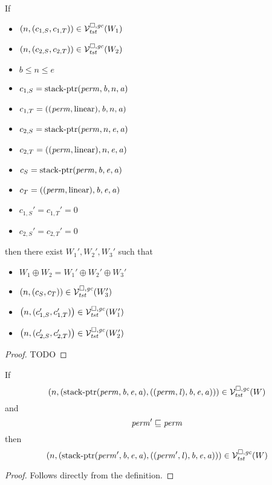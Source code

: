 \begin{lemma}
  \label{lem:splitting-safety-stack}
  If
  \begin{itemize}
  \item $\left(n,(c_{1,S},c_{1,T})\right) \in \mathcal{V}^{\square,\mathit{gc}}_{\mathit{tst}}(W_1)$
  \item $\left(n,(c_{2,S},c_{2,T})\right) \in \mathcal{V}^{\square,\mathit{gc}}_{\mathit{tst}}(W_2)$
  \item $b \le n \le e$
  \item $c_{1,S} = \mathrm{stack\text{-}ptr}(\mathit{perm},\mathit{b},n,\mathit{a})$
  \item $c_{1,T} = ((\mathit{perm},\mathrm{linear}),\mathit{b},n,\mathit{a})$
  \item $c_{2,S} = \mathrm{stack\text{-}ptr}(\mathit{perm},n,\mathit{e},\mathit{a})$
  \item $c_{2,T} = ((\mathit{perm},\mathrm{linear}),n,\mathit{e},\mathit{a})$
  \item $c_S = \mathrm{stack\text{-}ptr}(\mathit{perm},\mathit{b},\mathit{e},\mathit{a})$
  \item $c_T = ((\mathit{perm},\mathrm{linear}),\mathit{b},\mathit{e},\mathit{a})$
  \item $c_{1,S}' = c_{1,T}' = 0$
  \item $c_{2,S}' = c_{2,T}' = 0$
  \end{itemize}
  then there exist $W_1',W_2',W_3'$ such that
  \begin{itemize}
  \item $W_1 \oplus W_2 = W_1' \oplus W_2' \oplus W_3'$
  \item $\left(n,(c_S,c_T)\right) \in \mathcal{V}^{\square,\mathit{gc}}_{\mathit{tst}}(W_3')$
  \item $\left(n,(c_{1,S}',c_{1,T}')\right) \in \mathcal{V}^{\square,\mathit{gc}}_{\mathit{tst}}(W_1')$
  \item $\left(n,(c_{2,S}',c_{2,T}')\right) \in \mathcal{V}^{\square,\mathit{gc}}_{\mathit{tst}}(W_2')$
  \end{itemize}
\end{lemma}
\begin{proof}
  TODO
\end{proof}

\begin{lemma}
\label{lem:stkptr-in-lrv-mono-perm}
  If
  \[
    \left(n,(\mathrm{stack\text{-}ptr}(\mathit{perm},\mathit{b},\mathit{e},\mathit{a}),((\mathit{perm},\mathit{l}),\mathit{b},\mathit{e},\mathit{a}))\right) \in \mathcal{V}^{\square,\mathit{gc}}_{\mathit{tst}}(W)
  \]
  and
  \[
    \mathit{perm}' \sqsubseteq \mathit{perm}
  \]
  then
  \[
    \left(n,(\mathrm{stack\text{-}ptr}(\mathit{perm}',\mathit{b},\mathit{e},\mathit{a}),((\mathit{perm}',\mathit{l}),\mathit{b},\mathit{e},\mathit{a}))\right) \in \mathcal{V}^{\square,\mathit{gc}}_{\mathit{tst}}(W)
  \]
\end{lemma}
\begin{proof}
  Follows directly from the definition.
\end{proof}


